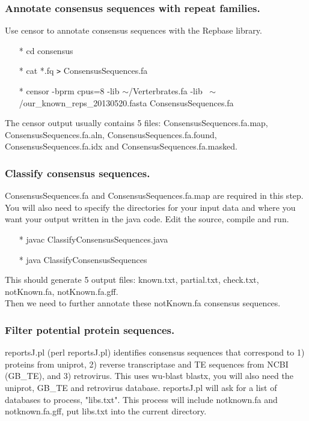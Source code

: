 \documentclass[12pt]{report}
\begin{document}
\subsubsection*{Annotate consensus sequences with repeat families.}
Use censor to annotate consensus sequences with the Repbase library. 
\begin{enumerate}
	\item[*] cd consensus
	\item[*] cat *.fq \texttt{>} ConsensusSequences.fa 
	\item[*] censor -bprm cpus=8 -lib $\sim$/Verterbrates.fa -lib ~$\sim$/our\_known\_reps\_20130520.fasta ConsensusSequences.fa 
\end{enumerate}
The censor output usually contains 5 files: ConsensusSequences.fa.map, ConsensusSequences.fa.aln, ConsensusSequences.fa.found, ConsensusSequences.fa.idx and ConsensusSequences.fa.masked.  \\

\subsubsection*{Classify consensus sequences.}
ConsensusSequences.fa and ConsensusSequences.fa.map are required in this step. You will also need to specify the directories for your input data and where you want your output written in the java code. Edit the source, compile and run.\\
\begin{enumerate}
	\item[*] javac ClassifyConsensusSequences.java
	\item[*] java ClassifyConsensusSequences
\end{enumerate}
This should generate 5 output files: known.txt, partial.txt, check.txt, notKnown.fa, notKnown.fa.gff. \\
Then we need to further annotate these notKnown.fa consensus sequences. 

\subsubsection*{Filter potential protein sequences.}
reportsJ.pl (perl reportsJ.pl) identifies consensus sequences that correspond to 1) proteins from uniprot, 2) reverse transcriptase and TE sequences from NCBI (GB\_TE), and 3) retrovirus. This uses wu-blast blastx, you will also need the uniprot, GB\_TE and retrovirus database. reportsJ.pl will ask for a list of databases to process, "libs.txt". This process will include notknown.fa and notknown.fa.gff, put libs.txt into the current directory. \\
\end{document}

